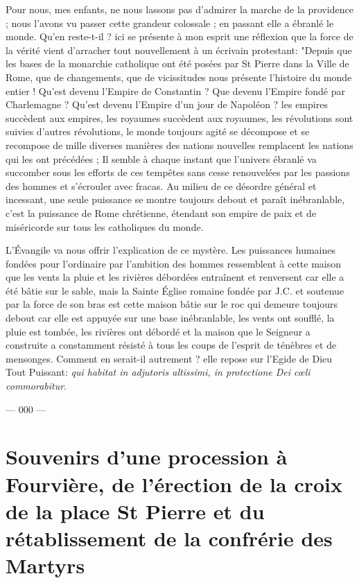 \documentclass[11pt,a4paper]{report}
\begin{document}
Pour nous, mes enfants, ne nous lassons pas d'admirer la marche de la providence ; nous l'avons vu passer cette grandeur colossale ; en passant elle a ébranlé le monde. Qu'en reste-t-il ? ici se présente à mon esprit une réflexion que la force de la vérité vient d'arracher tout nouvellement à un écrivain protestant: "Depuis que les bases de la monarchie catholique ont été posées par St Pierre dans la Ville de Rome, que de changements, que de vicissitudes nous présente l'histoire du monde entier ! Qu'est devenu l'Empire de Constantin ? Que devenu l'Empire fondé par Charlemagne ? Qu'est devenu l'Empire d'un jour de Napoléon ? les empires succèdent aux empires, les royaumes succèdent aux royaumes, les révolutions sont suivies d'autres révolutions, le monde toujours agité se décompose et se recompose de mille diverses manières des nations nouvelles remplacent les nations qui les ont précédées ; Il semble à chaque instant que l'univers ébranlé va succomber sous les efforts de ces tempêtes sans cesse renouvelées par les passions des hommes et s'écrouler avec fracas. Au milieu de ce désordre général et incessant, une seule puissance se montre toujours debout et paraît inébranlable, c'est la puissance de Rome chrétienne, étendant son empire de paix et de miséricorde sur tous les catholiques du monde.

L'Évangile va nous offrir l'explication de ce mystère. Les puissances humaines fondées pour l'ordinaire par l'ambition des hommes ressemblent à cette maison que les vents la pluie et les rivières débordées entraînent et renversent car elle a été bâtie sur le sable, mais la Sainte Église romaine fondée par J.C. et soutenue par la force de son bras est cette maison bâtie sur le roc qui demeure toujours debout car elle est appuyée sur une base inébranlable, les vents ont soufflé, la pluie est tombée, les rivières ont débordé et la maison que le Seigneur a construite a constamment résisté à tous les coups de l'esprit de ténèbres et de mensonges. Comment en serait-il autrement ? elle repose sur l'Egide de Dieu Tout Puissant: \textit{qui habitat in adjutoris altissimi, in protectione Dei cœli commorabitur}.

\vspace{1cm}

\begin{center}
--- 000 ---
\end{center}


\chapter{Souvenirs d'une procession à Fourvière, de l'érection de la croix de la place St Pierre et du rétablissement de la confrérie des Martyrs}
\end{document}
